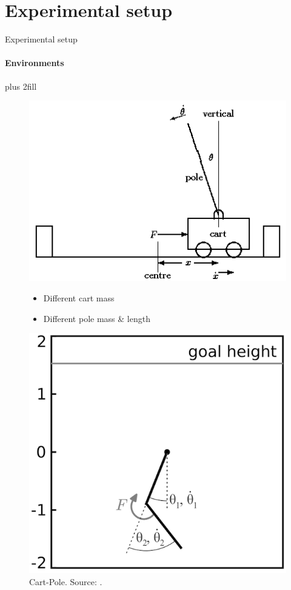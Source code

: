 \documentclass{beamer}
\begin{document}
\section{Experimental setup}
\begin{frame}[fragile]{Experimental setup}
\framesubtitle{Environments}
\vskip0pt plus 2fill
\begin{figure}[htb]
    \begin{minipage}{0.55\textwidth}
            \includegraphics[width=\linewidth]{cartpole.png}
            \caption{Cart-Pole. Source: \cite{grant1990modelling}.}
            \begin{itemize}
                \item Different cart mass
                \item Different pole mass \& length
            \end{itemize}
    \end{minipage}\hfill
    \begin{minipage}{0.45\textwidth}
            \includegraphics[width=\linewidth]{acrobot.png}

\end{minipage}
\end{figure}
\end{frame}
\end{document}
